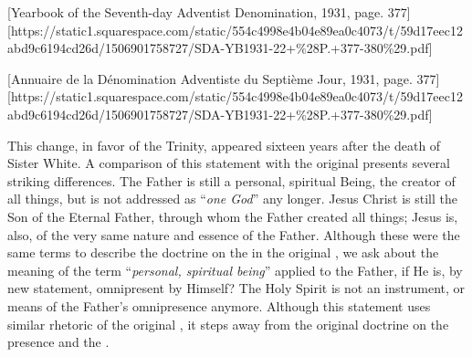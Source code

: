 



[Yearbook of the Seventh-day Adventist Denomination, 1931, page. 377][https://static1.squarespace.com/static/554c4998e4b04e89ea0c4073/t/59d17eec12abd9c6194cd26d/1506901758727/SDA-YB1931-22+\%28P.+377-380\%29.pdf]


[Annuaire de la Dénomination Adventiste du Septième Jour, 1931, page. 377][https://static1.squarespace.com/static/554c4998e4b04e89ea0c4073/t/59d17eec12abd9c6194cd26d/1506901758727/SDA-YB1931-22+\%28P.+377-380\%29.pdf]


This change, in favor of the Trinity, appeared sixteen years after the death of Sister White. A comparison of this statement with the original  presents several striking differences. The Father is still a personal, spiritual Being, the creator of all things, but is not addressed as “\textit{one God}” any longer. Jesus Christ is still the Son of the Eternal Father, through whom the Father created all things; Jesus is, also, of the very same nature and essence of the Father. Although these were the same terms to describe the doctrine on the  in the original , we ask about the meaning of the term “\textit{personal, spiritual being}” applied to the Father, if He is, by new statement, omnipresent by Himself? The Holy Spirit is not an instrument, or means of the Father’s omnipresence anymore. Although this statement uses similar rhetoric of the original , it steps away from the original doctrine on the presence and the .



